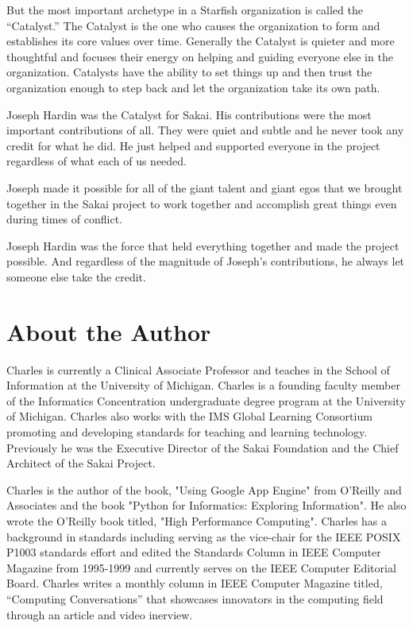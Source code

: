 \documentclass[12pt]{book}
\begin{document}
But the most important archetype in a Starfish organization
is called the ``Catalyst.''  The Catalyst is the one who causes
the organization to form and establishes its core values
over time.  Generally
the Catalyst is quieter and more thoughtful and focuses their
energy on helping and guiding everyone else in the organization.
Catalysts have the ability to set things up and then trust the
organization enough to step back and let the organization take its
own path.

Joseph Hardin was the Catalyst for Sakai.  His contributions were
the most important contributions of all.  They were quiet and subtle
and he never took any credit for what he did.  He just helped and
supported everyone in the project regardless of what each of us
needed.

Joseph made it possible for all of the giant talent and giant egos
that we brought together in the Sakai project to work together and accomplish
great things even during times of conflict.

Joseph Hardin was the force that held everything together and made
the project possible.  And regardless of the magnitude of Joseph's
contributions, he always let someone else take the credit.

% 

\newpage

\section*{About the Author}

Charles is currently a Clinical Associate Professor and teaches in the School of Information at the University of Michigan. Charles is a founding faculty member of the Informatics Concentration undergraduate degree program at the University of Michigan. Charles also works with the IMS Global Learning Consortium promoting and developing standards for teaching and learning technology. Previously he was the Executive Director of the Sakai Foundation and the Chief Architect of the Sakai Project.

Charles is the author of the book, "Using Google App Engine" from O'Reilly and Associates and the book "Python for Informatics: Exploring Information". He also wrote the O'Reilly book titled, "High Performance Computing". Charles has a background in standards including serving as the vice-chair for the IEEE POSIX P1003 standards effort and edited the Standards Column in IEEE Computer Magazine from 1995-1999 and currently serves on the IEEE Computer Editorial Board.  Charles
writes a monthly column in IEEE Computer Magazine titled, ``Computing Conversations''
that showcases innovators in the computing field through an article and video inerview.
\end{document}
